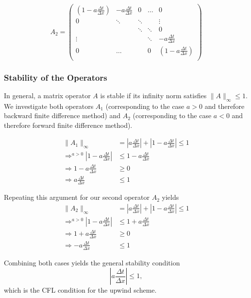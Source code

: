 $$ 
A_2 = \begin{pmatrix}
 \left(1-a\frac{\Delta t}{\Delta x}\right) & -a\frac{\Delta t}{\Delta x}
 & 0 & \dots & 0 \\
 0 & \ddots & \ddots & & \vdots \\
 &  & \ddots & \ddots & 0 \\
 \vdots & & & \ddots & -a\frac{\Delta t}{\Delta x}\\
 0 & \dots &  & 0 & \left(1-a\frac{\Delta t}{\Delta x}\right) \\
\end{pmatrix} $$

\subsubsection*{Stability of the Operators}
In general, a matrix operator $A$ is stable if its infinity norm satisfies
$\|A\|_{\infty} \leq 1$. We investigate both operators $A_1$ 
(corresponding to the case $a > 0$ and therefore backward finite
difference method) and $A_2$ (corresponding to the case $a < 0$ and
therefore forward finite difference method).

\begin{align}
    \|A_1\|_{\infty} &= \left|a\frac{\Delta t}{\Delta x}\right| + \left|
        1- a \frac{\Delta t}{\Delta x}\right| \leq 1 \\
    \Rightarrow^{a> 0}  \left|1- a \frac{\Delta t}{\Delta x}\right| &\leq
    1 - a \frac{\Delta t}{\Delta x} \\
    \Rightarrow 1 - a\frac{\Delta t}{\Delta x} &\geq 0 \\
    \Rightarrow a \frac{\Delta t}{\Delta x}&\leq 1 
\end{align}

Repeating this argument for our second operator $A_2$ yields
\begin{align}
    \|A_2\|_{\infty} &= \left|a\frac{\Delta t}{\Delta x}\right| + 
    \left|1- a \frac{\Delta t}{\Delta x}\right| \leq 1 \\
    \Rightarrow^{a> 0}  \left|1- a \frac{\Delta t}{\Delta x}\right| 
    &\leq 1 + a \frac{\Delta t}{\Delta x} \\
    \Rightarrow 1 + a\frac{\Delta t}{\Delta x} &\geq 0 \\
    \Rightarrow - a \frac{\Delta t}{\Delta x}&\leq 1 
\end{align}

Combining both cases yields the general stability condition
$$\left|a\frac{\Delta t}{\Delta x}\right| \leq 1,$$ 
which is the CFL condition for the upwind scheme.

